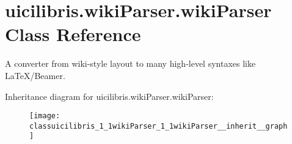\hypertarget{classuicilibris_1_1wikiParser_1_1wikiParser}{\section{uicilibris.\-wiki\-Parser.\-wiki\-Parser \-Class \-Reference}
\label{classuicilibris_1_1wikiParser_1_1wikiParser}
}


\-A converter from wiki-\/style layout to many high-\/level syntaxes like \-La\-Te\-X/\-Beamer.  




\-Inheritance diagram for uicilibris.\-wiki\-Parser.\-wiki\-Parser\-:
\nopagebreak
\begin{figure}[H]
\begin{center}
\leavevmode
\texttt{[image: classuicilibris\_1\_1wikiParser\_1\_1wikiParser\_\_inherit\_\_graph]}
\end{center}
\end{figure}
